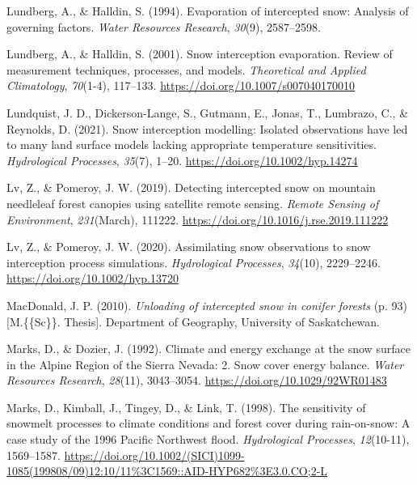 \documentclass[
  letterpaper,
]{tex/uofsthesis-cs}
\newlength{\cslhangindent}
\newenvironment{CSLReferences}[2] %
 {\begin{list}{}{%
  \setlength{\itemindent}{0pt}
  \setlength{\leftmargin}{0pt}
  \setlength{\parsep}{0pt}
  \ifodd #1
   \setlength{\leftmargin}{\cslhangindent}
   \setlength{\itemindent}{-1\cslhangindent}
  \fi
  \setlength{\itemsep}{#2\baselineskip}}}
 {\end{list}}
\begin{document}
\begin{CSLReferences}{1}{0}
Lundberg, A., \& Halldin, S. (1994). Evaporation of intercepted snow:
{Analysis} of governing factors. \emph{Water Resources Research},
\emph{30}(9), 2587--2598.

Lundberg, A., \& Halldin, S. (2001). Snow interception evaporation.
{Review} of measurement techniques, processes, and models.
\emph{Theoretical and Applied Climatology}, \emph{70}(1-4), 117--133.
\url{https://doi.org/10.1007/s007040170010}

Lundquist, J. D., Dickerson-Lange, S., Gutmann, E., Jonas, T., Lumbrazo,
C., \& Reynolds, D. (2021). Snow interception modelling: {Isolated}
observations have led to many land surface models lacking appropriate
temperature sensitivities. \emph{Hydrological Processes}, \emph{35}(7),
1--20. \url{https://doi.org/10.1002/hyp.14274}

Lv, Z., \& Pomeroy, J. W. (2019). Detecting intercepted snow on mountain
needleleaf forest canopies using satellite remote sensing. \emph{Remote
Sensing of Environment}, \emph{231}(March), 111222.
\url{https://doi.org/10.1016/j.rse.2019.111222}

Lv, Z., \& Pomeroy, J. W. (2020). Assimilating snow observations to snow
interception process simulations. \emph{Hydrological Processes},
\emph{34}(10), 2229--2246. \url{https://doi.org/10.1002/hyp.13720}

MacDonald, J. P. (2010). \emph{Unloading of intercepted snow in conifer
forests} (p. 93) {[}M.\{\{Sc\}\}. Thesis{]}. Department of Geography,
University of Saskatchewan.

Marks, D., \& Dozier, J. (1992). Climate and energy exchange at the snow
surface in the {Alpine Region} of the {Sierra Nevada}: 2. {Snow} cover
energy balance. \emph{Water Resources Research}, \emph{28}(11),
3043--3054. \url{https://doi.org/10.1029/92WR01483}

Marks, D., Kimball, J., Tingey, D., \& Link, T. (1998). The sensitivity
of snowmelt processes to climate conditions and forest cover during
rain-on-snow: A case study of the 1996 {Pacific Northwest} flood.
\emph{Hydrological Processes}, \emph{12}(10-11), 1569--1587.
\url{https://doi.org/10.1002/(SICI)1099-1085(199808/09)12:10/11\%3C1569::AID-HYP682\%3E3.0.CO;2-L}


\end{CSLReferences}
\end{document}
